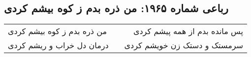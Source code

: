 \begin{center}
\section*{رباعی شماره ۱۹۶۵: من ذره بدم ز کوه بیشم کردی}
\label{sec:1965}
\begin{longtable}{l p{0.5cm} r}
من ذره بدم ز کوه بیشم کردی
&&
پس مانده بدم از همه پیشم کردی
\\
درمان دل خراب و ریشم کردی
&&
سرمستک و دستک زن خویشم کردی
\\
\end{longtable}
\end{center}
